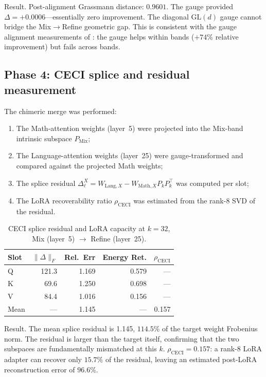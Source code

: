\documentclass[11pt]{article}
\begin{document}
Result. Post-alignment Grassmann distance: $0.9601$.
The gauge provided $\Delta{=}{+}0.0006$---essentially zero
improvement. The diagonal $\mathrm{GL}(d)$ gauge cannot bridge the
Mix$\to$Refine geometric gap. This is consistent with the gauge
alignment measurements of : the gauge helps
within bands ($+74\%$ relative improvement) but fails across bands.

\subsection{Phase 4: CECI splice and residual measurement}

The chimeric merge was performed:
\begin{enumerate}
\item The Math-attention weights (layer~5) were projected into the
 Mix-band intrinsic subspace $P_{\mathrm{Mix}}$;
\item The Language-attention weights (layer~25) were gauge-transformed
 and compared against the projected Math weights;
\item The splice residual $\Delta_\ell^X = W_{\mathrm{Lang},X} -
 W_{\mathrm{Math},X} P_k P_k^\top$ was computed per slot;
\item The LoRA recoverability ratio $\rho_{\mathrm{CECI}}$ was
 estimated from the rank-8 SVD of the residual.
\end{enumerate}

\begin{table}[h]\centering\small
\caption{CECI splice residual and LoRA capacity at $k{=}32$,
Mix (layer~5) $\to$ Refine (layer~25).}
\label{tab:ceci-splice}
\begin{tabular}{@{}lrrrr@{}}
\toprule
Slot & $\|\Delta\|_F$ & Rel.\ Err & Energy Ret. & $\rho_{\mathrm{CECI}}$ \\
\midrule
Q & 121.3 & 1.169 & 0.579 & --- \\
K & 69.6 & 1.250 & 0.698 & --- \\
V & 84.4 & 1.016 & 0.156 & --- \\
\midrule
Mean & --- & 1.145 & --- & 0.157 \\
\bottomrule
\end{tabular}
\end{table}

Result. The mean splice residual is 1.145, $114.5\%$
of the target weight Frobenius norm. The residual is larger than
the target itself, confirming that the two subspaces are fundamentally
mismatched at this $k$. $\rho_{\mathrm{CECI}}{=}0.157$: a rank-8 LoRA
adapter can recover only $15.7\%$ of the residual, leaving an estimated
post-LoRA reconstruction error of $96.6\%$.
\end{document}
